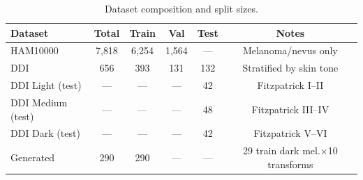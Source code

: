 \begin{table}[htbp]
\centering
\caption{Dataset composition and split sizes.}
\label{tab:dataset}
\begin{tabular}{lccccc}
\toprule
\textbf{Dataset} & Total & Train & Val & Test & Notes \\
\midrule
HAM10000 & 7{,}818 & 6{,}254 & 1{,}564 & --- & Melanoma/nevus only \\
DDI & 656 & 393 & 131 & 132 & Stratified by skin tone \\
DDI Light (test) & --- & --- & --- & 42 & Fitzpatrick I--II \\
DDI Medium (test) & --- & --- & --- & 48 & Fitzpatrick III--IV \\
DDI Dark (test) & --- & --- & --- & 42 & Fitzpatrick V--VI \\
Generated & 290 & 290 & --- & --- & 29 train dark mel.$\times$10 transforms \\
\bottomrule
\end{tabular}
\end{table}
